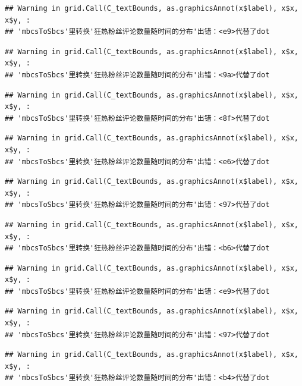 \documentclass[
]{article}
\begin{document}
\begin{verbatim}
## Warning in grid.Call(C_textBounds, as.graphicsAnnot(x$label), x$x, x$y, :
## 'mbcsToSbcs'里转换'狂热粉丝评论数量随时间的分布'出错：<e9>代替了dot
\end{verbatim}

\begin{verbatim}
## Warning in grid.Call(C_textBounds, as.graphicsAnnot(x$label), x$x, x$y, :
## 'mbcsToSbcs'里转换'狂热粉丝评论数量随时间的分布'出错：<9a>代替了dot
\end{verbatim}

\begin{verbatim}
## Warning in grid.Call(C_textBounds, as.graphicsAnnot(x$label), x$x, x$y, :
## 'mbcsToSbcs'里转换'狂热粉丝评论数量随时间的分布'出错：<8f>代替了dot
\end{verbatim}

\begin{verbatim}
## Warning in grid.Call(C_textBounds, as.graphicsAnnot(x$label), x$x, x$y, :
## 'mbcsToSbcs'里转换'狂热粉丝评论数量随时间的分布'出错：<e6>代替了dot
\end{verbatim}

\begin{verbatim}
## Warning in grid.Call(C_textBounds, as.graphicsAnnot(x$label), x$x, x$y, :
## 'mbcsToSbcs'里转换'狂热粉丝评论数量随时间的分布'出错：<97>代替了dot
\end{verbatim}

\begin{verbatim}
## Warning in grid.Call(C_textBounds, as.graphicsAnnot(x$label), x$x, x$y, :
## 'mbcsToSbcs'里转换'狂热粉丝评论数量随时间的分布'出错：<b6>代替了dot
\end{verbatim}

\begin{verbatim}
## Warning in grid.Call(C_textBounds, as.graphicsAnnot(x$label), x$x, x$y, :
## 'mbcsToSbcs'里转换'狂热粉丝评论数量随时间的分布'出错：<e9>代替了dot
\end{verbatim}

\begin{verbatim}
## Warning in grid.Call(C_textBounds, as.graphicsAnnot(x$label), x$x, x$y, :
## 'mbcsToSbcs'里转换'狂热粉丝评论数量随时间的分布'出错：<97>代替了dot
\end{verbatim}

\begin{verbatim}
## Warning in grid.Call(C_textBounds, as.graphicsAnnot(x$label), x$x, x$y, :
## 'mbcsToSbcs'里转换'狂热粉丝评论数量随时间的分布'出错：<b4>代替了dot
\end{verbatim}
\end{document}
